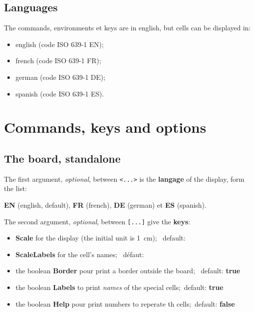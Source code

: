 \documentclass{article}
\newcommand\Cle[1]{{\bfseries\sffamily\textlangle #1\textrangle}}
\begin{document}
\subsection{Languages}

The \textsf{commands}, \textsf{environments} et \textsf{keys} are in english, but cells can be displayed in:

\begin{itemize}
	\item english (code ISO 639-1 EN);
	\item french (code ISO 639-1 FR);
	\item german (code ISO 639-1 DE);
	\item spanish (code ISO 639-1 ES).
\end{itemize}

\pagebreak

\section{Commands, keys and options}

\subsection{The board, standalone}

The first argument, \textit{optional}, between \texttt{<...>} is the \Cle{langage} of the display, form the list:

\hfill\Cle{EN} (english, default), \Cle{FR} (french), \Cle{DE} (german) et \Cle{ES} (spanish).\hfill~

\smallskip

The second argument, \textit{optional}, between \texttt{[...]} give the \Cle{keys}:

\begin{itemize}
	\item \Cle{Scale} for the display (the initial unit is 1~cm); \hfill~default: \Cle{1}
	\item \Cle{ScaleLabels} for the cell's names; \hfill~défaut: \Cle{1}
	\item the boolean \Cle{Border} pour print a border outside the board; \hfill~default: \Cle{true}
	\item the boolean \Cle{Labels} to print \textit{names} of the special cells;\hfill~default: \Cle{true}
	\item the boolean \Cle{Help} pour print numbers to reperate th cells;\hfill~default: \Cle{false}
\end{itemize}
\end{document}
